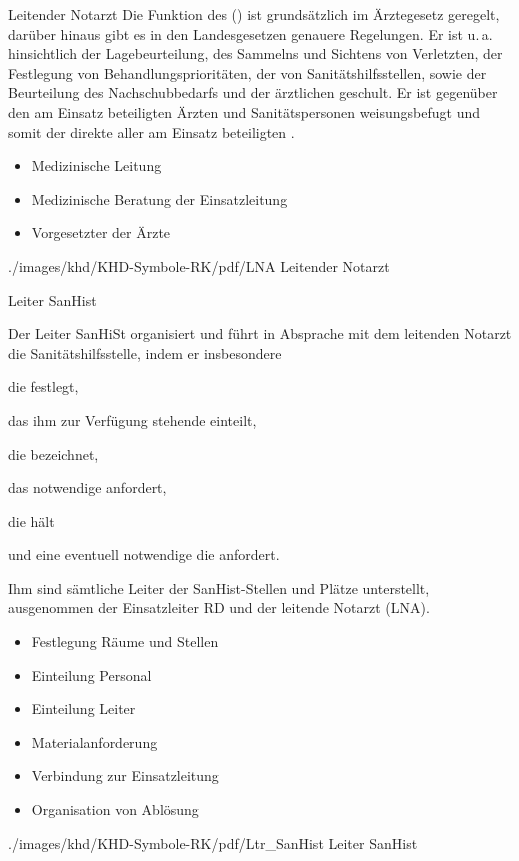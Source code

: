\TextSlideTeaser
{Leitender Notarzt}%
{%
%
%
Die Funktion des  
() 
ist grundsätzlich im Ärztegesetz 
geregelt, 
darüber hinaus gibt es in den Landesgesetzen genauere Regelungen. 
Er ist u.\,a. hinsichtlich der Lagebeurteilung, 
des Sammelns und Sichtens von Verletzten,
der Festlegung von Behandlungsprioritäten,
der  von Sanitätshilfsstellen,
sowie der Beurteilung des Nachschubbedarfs
und der ärztlichen  
geschult.
%
Er ist gegenüber den am Einsatz beteiligten Ärzten und 
Sanitätspersonen weisungsbefugt 
und somit der direkte  aller am Einsatz beteiligten 
\cite{RkRahmenvorschriftGrossunfaelle2007}.
}%
{%
\begin{itemize}
  \item Medizinische Leitung
  \item Medizinische Beratung der Einsatzleitung
  \item Vorgesetzter der Ärzte
\end{itemize}}%
{./images/khd/KHD-Symbole-RK/pdf/LNA}%
{Leitender Notarzt}%
{}%
{}%
{}%

\TextSlideTeaser
{Leiter SanHist}%
{%
%
%
Der Leiter SanHiSt organisiert und führt in Absprache mit dem leitenden 
Notarzt die Sanitätshilfsstelle, indem er insbesondere 
\begin{inparaitem}
  \item die  festlegt,
  \item das ihm zur Verfügung stehende einteilt,
  \item die  bezeichnet,
  \item das notwendige  anfordert,
  \item die  hält
  \item und eine eventuell notwendige die  anfordert.
\end{inparaitem}
Ihm sind sämtliche Leiter der SanHist-Stellen und Plätze unterstellt, 
ausgenommen der Einsatzleiter RD und der leitende Notarzt (LNA).
\cite{RkRahmenvorschriftGrossunfaelle2007}
}%
{
\begin{itemize}
  \item Festlegung Räume und Stellen
  \item Einteilung Personal 
  \item Einteilung Leiter
  \item Materialanforderung
  \item  Verbindung zur Einsatzleitung 
  \item Organisation von Ablösung 
\end{itemize}

}%
{./images/khd/KHD-Symbole-RK/pdf/Ltr_SanHist}%
{Leiter SanHist}%
{}%
{}%
{}%

